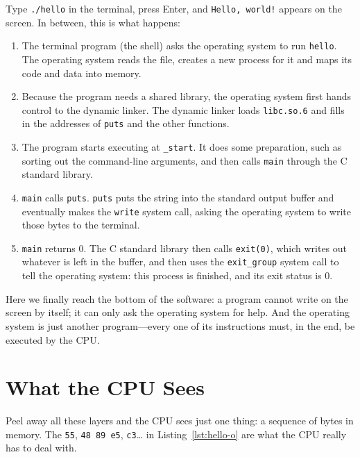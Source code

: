 Type \texttt{./hello} in the terminal, press Enter, and \texttt{Hello, world!} appears on the screen. In between, this is what happens:
\begin{enumerate}
  \item The terminal program (the shell) asks the operating system to run \texttt{hello}. The operating system reads the file, creates a new process for it and maps its code and data into memory.
  \item Because the program needs a shared library, the operating system first hands control to the dynamic linker. The dynamic linker loads \texttt{libc.so.6} and fills in the addresses of \texttt{puts} and the other functions.
  \item The program starts executing at \texttt{\_start}. It does some preparation, such as sorting out the command-line arguments, and then calls \texttt{main} through the C standard library.
  \item \texttt{main} calls \texttt{puts}. \texttt{puts} puts the string into the standard output buffer and eventually makes the \texttt{write} system call, asking the operating system to write those bytes to the terminal.
  \item \texttt{main} returns 0. The C standard library then calls \texttt{exit(0)}, which writes out whatever is left in the buffer, and then uses the \texttt{exit\_group} system call to tell the operating system: this process is finished, and its exit status is 0.
\end{enumerate}

Here we finally reach the bottom of the software: a program cannot write on the screen by itself; it can only ask the operating system for help. And the operating system is just another program---every one of its instructions must, in the end, be executed by the CPU.

\section{What the CPU Sees}

Peel away all these layers and the CPU sees just one thing: a sequence of bytes in memory. The \texttt{55}, \texttt{48 89 e5}, \texttt{c3}\ldots{} in Listing~\ref{lst:hello-o} are what the CPU really has to deal with.

